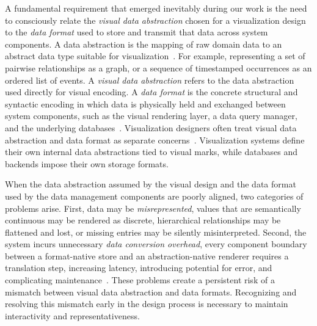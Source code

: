 \begin{refsection}
A fundamental requirement that emerged inevitably during our work is the need to consciously relate the \textit{visual data abstraction} chosen for a visualization design to the \textit{data format} used to store and transmit that data across system components. A data abstraction is the mapping of raw domain data to an abstract data type suitable for visualization~\cite{munzner2014vad}. For example, representing a set of pairwise relationships as a graph, or a sequence of timestamped occurrences as an ordered list of events. A \textit{visual data abstraction} refers to the data abstraction used directly for visual encoding. A \textit{data format} is the concrete structural and syntactic encoding in which data is physically held and exchanged between system components, such as the visual rendering layer, a data query manager, and the underlying databases~\cite{kandel2011wrangling}. Visualization designers often treat visual data abstraction and data format as separate concerns~\cite{bigelow2020guidelines}. Visualization systems define their own internal data abstractions tied to visual marks, while databases and backends impose their own storage formats. 

When the data abstraction assumed by the visual design and the data format used by the data management components are poorly aligned, two categories of problems arise. First, data may be \textit{misrepresented}, values that are semantically continuous may be rendered as discrete, hierarchical relationships may be flattened and lost, or missing entries may be silently misinterpreted. Second, the system incurs unnecessary \textit{data conversion overhead}, every component boundary between a format-native store and an abstraction-native renderer requires a translation step, increasing latency, introducing potential for error, and complicating maintenance~\cite{battle2020structured, heer2023mosaic, yang2024optimizing, kandel2011wrangling}. These problems create a persistent risk of a mismatch between visual data abstraction and data formats. Recognizing and resolving this mismatch early in the design process is necessary to maintain interactivity and representativeness.


\end{refsection}
